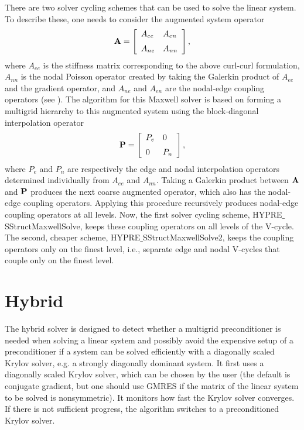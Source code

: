 There are two solver cycling schemes that can be used to solve the linear system. To describe these, one
needs to consider the augmented system operator
\begin{eqnarray}
\bf{A}= \left [
  \begin{array}{ll}
     A_{ee} & A_{en}  \\ \rule{0cm}{.5cm}
     A_{ne} & A_{nn}
  \end{array}
\right ],
\end{eqnarray}
where $A_{ee}$ is the stiffness matrix corresponding to the above curl-curl formulation, $A_{nn}$
is the nodal Poisson operator created by taking the Galerkin product of $A_{ee}$ and the gradient operator,
and $A_{ne}$ and $A_{en}$ are the nodal-edge coupling operators (see \cite{JonesLee_2006}). The algorithm
for this Maxwell solver is based on forming a multigrid hierarchy to this augmented system using the block-diagonal
interpolation operator 
\begin{eqnarray*}
\bf{P}= \left[  \begin{array}{ll}
            P_e & 0  \\ \rule{0cm}{.5cm}
            0   & P_n
         \end{array}
\right],
\end{eqnarray*}
where $P_e$ and $P_n$ are respectively the edge and nodal interpolation operators determined individually
from $A_{ee}$ and $A_{nn}.$ Taking a Galerkin product between $\bf{A}$ and $\bf{P}$ produces the next coarse
augmented operator, which also has the nodal-edge coupling operators. Applying this procedure recursively
produces nodal-edge coupling operators at all levels. Now, the first solver cycling scheme,
HYPRE$\_$SStructMaxwellSolve, keeps these coupling operators on all levels of the V-cycle. The second,
cheaper scheme, HYPRE$\_$SStructMaxwellSolve2, keeps the coupling operators only on the finest level, i.e.,
separate edge and nodal V-cycles that couple only on the finest level.


\section{Hybrid}

The hybrid solver is designed to detect whether a multigrid preconditioner
is needed when solving a linear system and possibly avoid the expensive setup
of a preconditioner if a system can be solved efficiently with a diagonally
scaled Krylov solver, e.g. a strongly diagonally dominant system. 
It first uses a diagonally scaled Krylov solver, which can be chosen by the user
(the default is conjugate gradient, but one should use GMRES if the matrix of the 
linear system to be solved is nonsymmetric). It monitors how fast the Krylov solver
converges.
If there is not sufficient progress, the algorithm switches to a preconditioned
Krylov solver.

